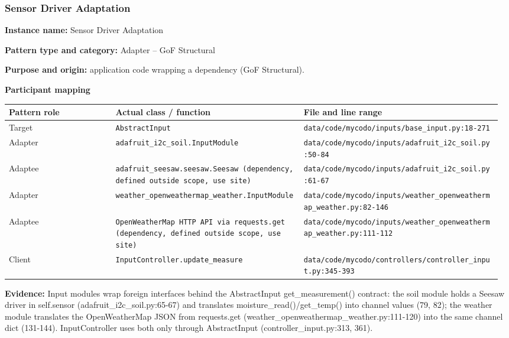 \documentclass[11pt,a4paper]{article}
\newcommand{\field}[2]{\textbf{#1:} #2\par}
\begin{document}
\subsubsection{Sensor Driver Adaptation}
\field{Instance name}{Sensor Driver Adaptation}
\field{Pattern type and category}{Adapter -- GoF Structural}
\field{Purpose and origin}{application code wrapping a dependency (GoF Structural).}
\textbf{Participant mapping}\par
{\small\setlength{\tabcolsep}{3pt}
\begin{longtable}{@{}P{0.21\linewidth}P{0.37\linewidth}P{0.39\linewidth}@{}}\toprule
\textbf{Pattern role} & \textbf{Actual class / function} & \textbf{File and line range} \\ \midrule\endhead
Target & \texttt{AbstractInput} & \texttt{data/\allowbreak{}code/\allowbreak{}mycodo/\allowbreak{}inputs/\allowbreak{}base\_\allowbreak{}input.\allowbreak{}py:18-271} \\
Adapter & \texttt{adafruit\_\allowbreak{}i2c\_\allowbreak{}soil.\allowbreak{}InputModule} & \texttt{data/\allowbreak{}code/\allowbreak{}mycodo/\allowbreak{}inputs/\allowbreak{}adafruit\_\allowbreak{}i2c\_\allowbreak{}soil.\allowbreak{}py:50-84} \\
Adaptee & \texttt{adafruit\_\allowbreak{}seesaw.\allowbreak{}seesaw.\allowbreak{}Seesaw (dependency, defined outside scope, use site)} & \texttt{data/\allowbreak{}code/\allowbreak{}mycodo/\allowbreak{}inputs/\allowbreak{}adafruit\_\allowbreak{}i2c\_\allowbreak{}soil.\allowbreak{}py:61-67} \\
Adapter & \texttt{weather\_\allowbreak{}openweathermap\_\allowbreak{}weather.\allowbreak{}InputModule} & \texttt{data/\allowbreak{}code/\allowbreak{}mycodo/\allowbreak{}inputs/\allowbreak{}weather\_\allowbreak{}openweathermap\_\allowbreak{}weather.\allowbreak{}py:82-146} \\
Adaptee & \texttt{OpenWeatherMap HTTP API via requests.\allowbreak{}get (dependency, defined outside scope, use site)} & \texttt{data/\allowbreak{}code/\allowbreak{}mycodo/\allowbreak{}inputs/\allowbreak{}weather\_\allowbreak{}openweathermap\_\allowbreak{}weather.\allowbreak{}py:111-112} \\
Client & \texttt{InputController.\allowbreak{}update\_\allowbreak{}measure} & \texttt{data/\allowbreak{}code/\allowbreak{}mycodo/\allowbreak{}controllers/\allowbreak{}controller\_\allowbreak{}input.\allowbreak{}py:345-393} \\
\bottomrule\end{longtable}}
\field{Evidence}{Input modules wrap foreign interfaces behind the AbstractInput get\_measurement() contract: the soil module holds a Seesaw driver in self.sensor (adafruit\_i2c\_soil.py:65-67) and translates moisture\_read()/get\_temp() into channel values (79, 82); the weather module translates the OpenWeatherMap JSON from requests.get (weather\_openweathermap\_weather.py:111-120) into the same channel dict (131-144). InputController uses both only through AbstractInput (controller\_input.py:313, 361).}
\end{document}
